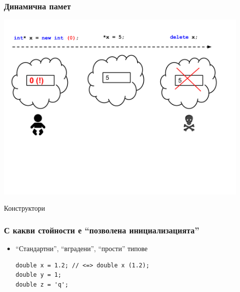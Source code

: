 \documentclass{beamer}
\begin{document}
\begin{frame}[fragile]
\frametitle{Динамична памет}
\includegraphics[width=12.5cm]{images/lc_heap_cons}
\end{frame}

\begin{frame}
\centerline{Конструктори}
\end{frame}

\begin{frame}[fragile]
\frametitle{С какви стойности е ``позволена инициализацията''}

\begin{itemize}
  \item ``Стандартни'', ``вградени'', ``прости'' типове

\begin{flushleft}
\begin{lstlisting}
double x = 1.2; // <=> double x (1.2);
double y = 1;
double z = 'q';
\end{lstlisting}  
\end{flushleft}


\end{itemize}

\end{frame}
\end{document}
